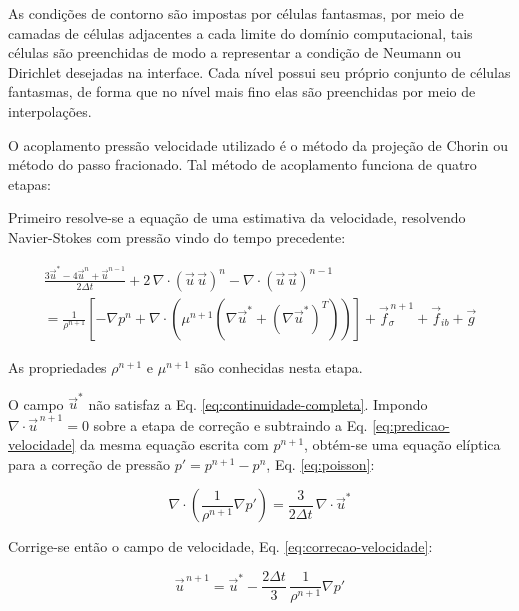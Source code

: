 As condições de contorno são impostas por células fantasmas, por meio de camadas de células adjacentes a cada limite do domínio computacional, tais células são preenchidas de modo a representar a condição de Neumann ou Dirichlet desejadas na interface. Cada nível possui seu próprio conjunto de células fantasmas, de forma que no nível mais fino elas são preenchidas por meio de interpolações.

O acoplamento pressão velocidade utilizado é o método da projeção de Chorin \citep{Martini2024} ou método do passo fracionado. Tal método de acoplamento funciona de quatro etapas:

Primeiro resolve-se a equação de uma estimativa da velocidade, resolvendo Navier-Stokes com pressão vindo do tempo precedente:

\begin{align}
    \frac{3\vec{u}^{*} - 4\vec{u}^{n} + \vec{u}^{n-1}}{2\Delta t}
    + 2\,\nabla \cdot \left( \vec{u}\,\vec{u} \right)^{n}
    - \nabla \cdot \left( \vec{u}\,\vec{u} \right)^{n-1}
    \nonumber \\ = \frac{1}{\rho^{n+1}} \left[
        - \nabla p^{n}
        + \nabla \cdot \left( \mu^{n+1} \left( \nabla \vec{u}^{*} + (\nabla \vec{u}^{*})^{T} \right) \right) 
    \right]
    + \vec{f}_{\sigma}^{\,n+1}
    + \vec{f}_{ib}
    + \vec{g}
    \label{eq:predicao-velocidade}
\end{align}

As propriedades $\rho^{n+1}$ e $\mu^{n+1}$ são conhecidas nesta etapa.

O campo $\vec{u}^{*}$ não satisfaz a Eq. \ref{eq:continuidade-completa}. Impondo $\nabla \cdot \vec{u}^{\,n+1} = 0$ sobre a etapa de correção e subtraindo a Eq. \ref{eq:predicao-velocidade} da mesma equação escrita com $p^{n+1}$, obtém-se uma equação elíptica para a correção de pressão $p' = p^{n+1} - p^{n}$, Eq. \ref{eq:poisson}:

\begin{equation}
    \nabla \cdot \left( \frac{1}{\rho^{n+1}} \nabla p' \right)
    = \frac{3}{2\Delta t} \, \nabla \cdot \vec{u}^{*}
    \label{eq:poisson}
\end{equation}

Corrige-se então o campo de velocidade, Eq. \ref{eq:correcao-velocidade}:

\begin{equation}
    \vec{u}^{\,n+1} = \vec{u}^{*}
    - \frac{2\Delta t}{3} \, \frac{1}{\rho^{n+1}} \nabla p'
    \label{eq:correcao-velocidade}
\end{equation}

